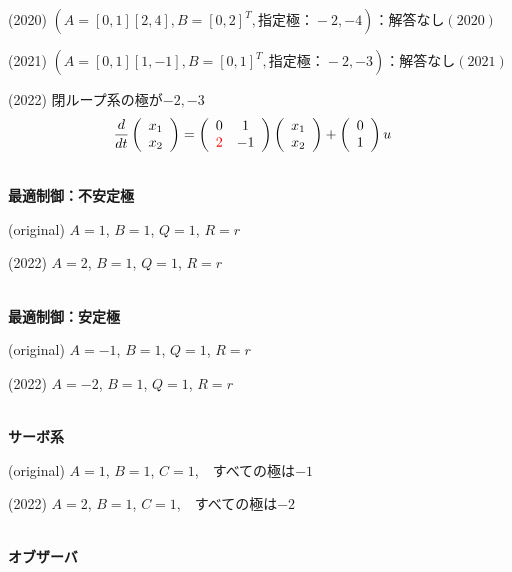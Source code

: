 \documentclass[a4paper,11pt,fleqn]{jreport}
\begin{document}
(2020) $(A=[0, 1][2, 4], B=[0, 2]^T, 指定極：-2,-4)：解答なし(2020) $

(2021) $(A=[0, 1][1, -1], B=[0, 1]^T, 指定極：-2,-3)：解答なし(2021)$

(2022)
閉ループ系の極が{\color{red}$-2,-3$}
\begin{align*}
	\frac{d}{dt}
	\left (
	\begin{array}{c}
	 x_1 \\ x_2 
	\end{array}
	\right )
	& = 
	\left (
	\begin{array}{cc}
	 0 & 1 \\
	 \color{red} 2 & -1
	\end{array}
	\right )
	\left (
	\begin{array}{c}
	 x_1 \\ x_2 
	\end{array}
	\right )
	+
	\left (
	\begin{array}{c}
	 0 \\ 1 
	\end{array}
	\right )
	u
\end{align*}

\ \\ \noindent
{\bf 最適制御：不安定極}

(original)
$A=1$, $B=1$, $Q=1$, $R=r$

(2022)
{\color{red}$A=2$}, $B=1$, $Q=1$, $R=r$

\ \\ \noindent
{\bf 最適制御：安定極}

(original)
$A=-1$, $B=1$, $Q=1$, $R=r$

(2022)
{\color{red}$A=-2$}, $B=1$, $Q=1$, $R=r$

\ \\ \noindent
{\bf サーボ系}

(original)
$A=1$, $B=1$, $C=1$,　すべての極は$-1$

(2022)
{\color{red}$A=2$}, $B=1$, $C=1$,　すべての極は{\color{red}$-2$}


\ \\ \noindent
{\bf オブザーバ}
\end{document}
